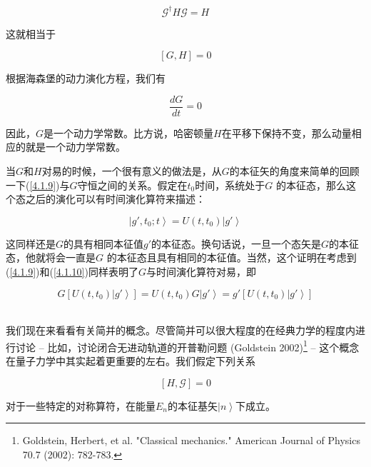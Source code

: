 \documentclass[UTF8,twoside]{ctexart}
\begin{document}
\begin{equation}
\mathscr{G}^{\dagger} H \mathscr{G} = H
\end{equation}

\noindent 这就相当于

\begin{equation} \label{4.1.9}
\left[G, H\right] = 0
\end{equation}

\noindent 根据海森堡的动力演化方程，我们有

\begin{equation} \label{4.1.10}
\frac{dG}{dt} = 0
\end{equation}

\noindent 因此，$G$是一个动力学常数。比方说，哈密顿量$H$在平移下保持不变，那么动量相应的就是一个动力学常数。

当$G$和$H$对易的时候，一个很有意义的做法是，从$G$的本征矢的角度来简单的回顾一下({\ref{4.1.9}})与$G$守恒之间的关系。假定在$t_0$时间，系统处于$G$ 的本征态，那么这个态之后的演化可以有时间演化算符来描述：

\begin{equation}
\left|g', t_0; t\right\rangle = U\left(t, t_0\right)\left|g'\right\rangle
\end{equation}

\noindent 这同样还是$G$的具有相同本征值$g'$的本征态。换句话说，一旦一个态矢是$G$的本征态，他就将会一直是$G$ 的本征态且具有相同的本征值。当然，这个证明在考虑到({\ref{4.1.9}})和({\ref{4.1.10}})同样表明了$G$与时间演化算符对易，即

\begin{equation}
G\left[U\left(t, t_0\right)\left|g'\right\rangle\right] = U\left(t, t_0\right)G\left|g'\right\rangle = g' \left[U\left(t, t_0\right)\left|g'\right\rangle\right]
\end{equation}
\\


\noindent 我们现在来看看有关简并的概念。尽管简并可以很大程度的在经典力学的程度内进行讨论 -- 比如，讨论闭合无进动轨道的开普勒问题 (Goldstein 2002)\footnote[3]{Goldstein, Herbert, et al. "Classical mechanics." American Journal of Physics 70.7 (2002): 782-783.} -- 这个概念在量子力学中其实起着更重要的左右。我们假定下列关系

\begin{equation}
\left[H, \mathscr{G}\right] = 0
\end{equation}

\noindent 对于一些特定的对称算符，在能量$E_n$的本征基矢$\left|n\right\rangle$下成立。
\end{document}
